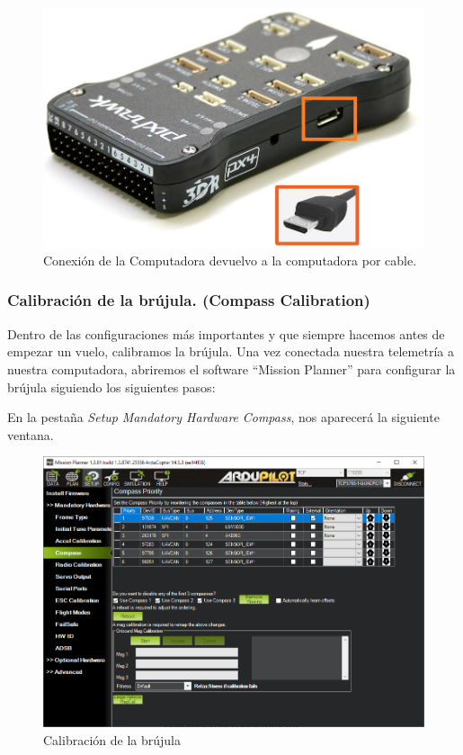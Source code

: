 \begin{figure}[H]
	\centering
	\includegraphics[width=0.7\linewidth]{imagenes/pixhawk}
	\caption{Conexión de la Computadora devuelvo a la computadora por cable.}
	\label{fig:pixhawk}
\end{figure}

\subsubsection{Calibración de la brújula. (Compass Calibration)}

Dentro de las configuraciones más importantes y que siempre hacemos antes de empezar un vuelo, calibramos la brújula. Una vez conectada nuestra telemetría a nuestra computadora, abriremos el software “Mission Planner” para configurar la brújula siguiendo los siguientes pasos:

 En la pestaña \textit{Setup} \textrightarrow \textit{Mandatory Hardware} \textrightarrow \textit{Compass}, nos aparecerá la siguiente ventana.

\begin{figure}[H]
	\centering
	\includegraphics[width=\linewidth]{imagenes/compass}
	\caption{Calibración de la brújula}
	\label{fig:compass}
\end{figure}


